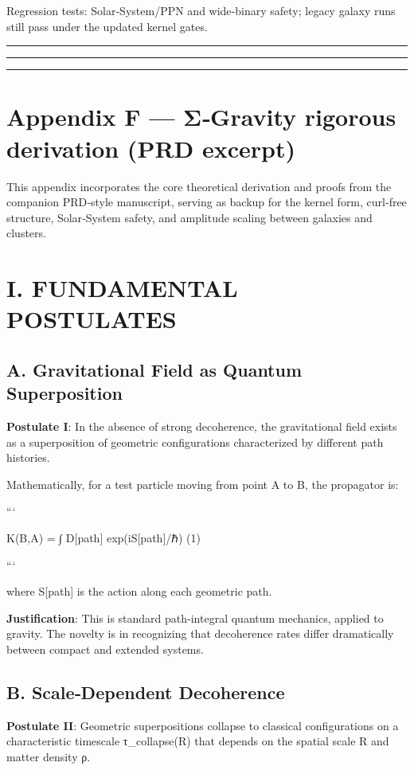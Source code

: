 \documentclass[11pt,a4paper]{article}
\begin{document}
Regression tests: Solar‑System/PPN and wide‑binary safety; legacy galaxy runs still pass under the updated kernel gates.


\medskip\hrule\medskip


\medskip\hrule\medskip


\medskip\hrule\medskip


\section{Appendix F — Σ‑Gravity rigorous derivation (PRD excerpt)}


This appendix incorporates the core theoretical derivation and proofs from the companion PRD‑style manuscript, serving as backup for the kernel form, curl‑free structure, Solar‑System safety, and amplitude scaling between galaxies and clusters.


\section{I. FUNDAMENTAL POSTULATES}


\subsection{A. Gravitational Field as Quantum Superposition}


\textbf{Postulate I}: In the absence of strong decoherence, the gravitational field exists as a superposition of geometric configurations characterized by different path histories.


Mathematically, for a test particle moving from point A to B, the propagator is:


```

K(B,A) = ∫ D[path] exp(iS[path]/ℏ)     (1)

```


where S[path] is the action along each geometric path.


\textbf{Justification}: This is standard path‑integral quantum mechanics, applied to gravity. The novelty is in recognizing that decoherence rates differ dramatically between compact and extended systems.


\subsection{B. Scale‑Dependent Decoherence}


\textbf{Postulate II}: Geometric superpositions collapse to classical configurations on a characteristic timescale τ\_collapse(R) that depends on the spatial scale R and matter density ρ.
\end{document}
